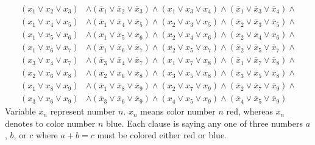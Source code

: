 \begin{align*}
(x_1 \vee x_2 \vee x_3 ) &\wedge ( \overline{x}_1 \vee \overline{x}_2 \vee \overline{x}_3 ) \wedge (x_1 \vee x_3 \vee x_4 ) \wedge ( \overline{x}_1 \vee \overline{x}_3 \vee \overline{x}_4 ) \wedge \\
(x_1 \vee x_4 \vee x_5 ) &\wedge ( \overline{x}_1 \vee \overline{x}_4 \vee \overline{x}_5 ) \wedge (x_2 \vee x_3 \vee x_5 ) \wedge ( \overline{x}_2 \vee \overline{x}_3 \vee \overline{x}_5 ) \wedge \\
(x_1 \vee x_5 \vee x_6 ) &\wedge ( \overline{x}_1 \vee \overline{x}_5 \vee \overline{x}_6 ) \wedge (x_2 \vee x_4 \vee x_6 ) \wedge ( \overline{x}_2 \vee \overline{x}_4 \vee \overline{x}_6 ) \wedge \\
(x_1 \vee x_6 \vee x_7 ) &\wedge ( \overline{x}_1 \vee \overline{x}_6 \vee \overline{x}_7 ) \wedge (x_2 \vee x_5 \vee x_7 ) \wedge ( \overline{x}_2 \vee \overline{x}_5 \vee \overline{x}_7 ) \wedge \\
(x_3 \vee x_4 \vee x_7 ) &\wedge ( \overline{x}_3 \vee \overline{x}_4 \vee \overline{x}_7 ) \wedge (x_1 \vee x_7 \vee x_8 ) \wedge ( \overline{x}_1 \vee \overline{x}_7 \vee \overline{x}_8 ) \wedge \\
(x_2 \vee x_6 \vee x_8 ) &\wedge ( \overline{x}_2 \vee \overline{x}_6 \vee \overline{x}_8 ) \wedge (x_3 \vee x_5 \vee x_8 ) \wedge ( \overline{x}_3 \vee \overline{x}_5 \vee \overline{x}_8 ) \wedge \\
(x_1 \vee x_8 \vee x_9 ) &\wedge ( \overline{x}_1 \vee \overline{x}_8 \vee \overline{x}_9 ) \wedge (x_2 \vee x_7 \vee x_9 ) \wedge ( \overline{x}_2 \vee \overline{x}_7 \vee \overline{x}_9 ) \wedge \\
(x_3 \vee x_6 \vee x_9 ) &\wedge ( \overline{x}_3 \vee \overline{x}_6 \vee \overline{x}_9 ) \wedge (x_4 \vee x_5 \vee x_9 ) \wedge ( \overline{x}_4 \vee \overline{x}_5 \vee \overline{x}_9 )
\end{align*}
Variable $x_n$ represent number $n$. $x_n$ means color number $n$ red, whereas $\overline{x}_n$ denotes to color number $n$ blue. Each clause is saying any one of three numbers $a$, $b$, or $c$ where $a + b = c$ must be colored either red or blue. \par
